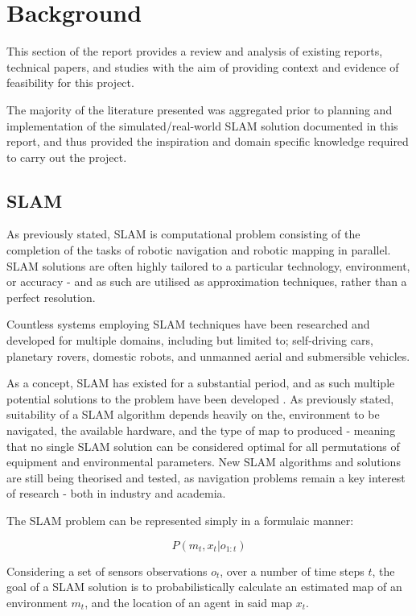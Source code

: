 \section{Background} \label{sec_background}
This section of the report provides a review and analysis of existing reports,
technical papers, and studies with the aim of providing context and evidence
of feasibility for this project.

The majority of the literature presented was aggregated prior to planning and
implementation of the simulated/real-world SLAM solution documented in this
report, and thus provided the inspiration and domain specific knowledge
required to carry out the project.


\subsection{SLAM} \label{sec_slam}
As previously stated, SLAM is computational problem consisting of the
completion of the tasks of robotic navigation and robotic mapping in parallel.
SLAM solutions are often highly tailored to a particular technology,
environment, or accuracy - and as such are utilised as approximation
techniques, rather than a perfect resolution.

Countless systems employing SLAM techniques have been researched and developed
for multiple domains, including but limited to; self-driving cars, planetary
rovers, domestic robots, and unmanned aerial and submersible vehicles.

As a concept, SLAM has existed for a substantial period, and as such multiple
potential solutions to the problem have been developed \cite{Riisgaard2004}.
As previously stated, suitability of a SLAM algorithm depends heavily on the,
environment to be navigated, the available hardware, and the type of map to
produced - meaning that no single SLAM solution can be considered optimal for
all permutations of equipment and environmental parameters.
New SLAM algorithms and solutions are still being theorised and tested, as
navigation problems remain a key interest of research - both in industry and
academia.

The SLAM problem can be represented simply in a formulaic manner:

\[ P(m_t,x_t|o_{1:t}) \]

Considering a set of sensors observations \(o_t \), over a number of time
steps \(t\), the goal of a SLAM solution is to probabilistically calculate an
estimated map of an environment \(m_t\), and the location of an agent in said
map \(x_t\).

